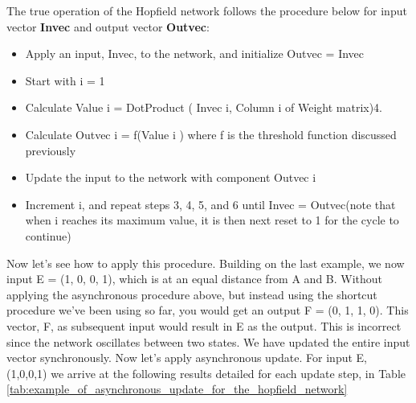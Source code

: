\documentclass[12pt, right open]{memoir}
\begin{document}
The true operation of the Hopfield network follows the procedure below for input vector \textbf{Invec} and output vector \textbf{Outvec}:

\begin {itemize}
\item Apply an input, Invec, to the network, and initialize Outvec = Invec
\item Start with i = 1
\item Calculate Value i = DotProduct ( Invec i, Column i of Weight matrix)4. 
\item Calculate Outvec i = f(Value i ) where f is the threshold function discussed previously
\item Update the input to the network with component Outvec i
\item Increment i, and repeat steps 3, 4, 5, and 6 until Invec = Outvec(note that when i reaches its maximum value, it is then next reset to 1 for the cycle to continue)
\end{itemize}

Now let’s see how to apply this procedure. Building on the last example, we
now input E = (1, 0, 0, 1), which is at an equal distance from A and B. Without
applying the asynchronous procedure above, but instead using the shortcut
procedure we’ve been using so far, you would get an output F = (0, 1, 1, 0).
This vector, F, as subsequent input would result in E as the output. This is
incorrect since the network oscillates between two states. We have updated the
entire input vector synchronously.
Now let’s apply asynchronous update. For input E, (1,0,0,1) we arrive at the
following results detailed for each update step, in Table \ref{tab:example_of_asynchronous_update_for_the_hopfield_network}
\end{document}
